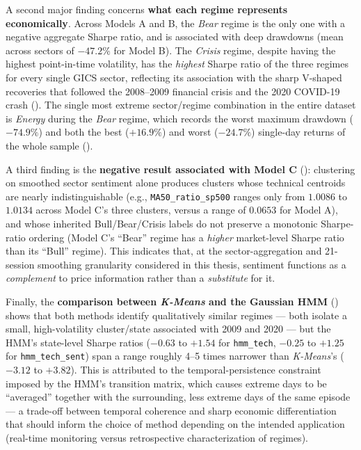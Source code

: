 A second major finding concerns \textbf{what each regime represents
economically}. Across Models A and B, the \emph{Bear} regime is the only
one with a negative aggregate Sharpe ratio, and is associated with deep
drawdowns (mean across sectors of $-47.2\%$ for Model B). The
\emph{Crisis} regime, despite having the highest point-in-time volatility,
has the \emph{highest} Sharpe ratio of the three regimes for every single
GICS sector, reflecting its association with the sharp V-shaped recoveries
that followed the 2008--2009 financial crisis and the 2020 COVID-19 crash
(). The single most extreme sector/regime
combination in the entire dataset is \emph{Energy} during the \emph{Bear}
regime, which records the worst maximum drawdown ($-74.9\%$) and both the
best ($+16.9\%$) and worst ($-24.7\%$) single-day returns of the whole
sample ().

A third finding is the \textbf{negative result associated with Model C}
(): clustering on smoothed sector sentiment alone
produces clusters whose technical centroids are nearly indistinguishable
(e.g., \texttt{MA50\_ratio\_sp500} ranges only from $1.0086$ to $1.0134$
across Model C's three clusters, versus a range of $0.0653$ for Model A),
and whose inherited Bull/Bear/Crisis labels do not preserve a monotonic
Sharpe-ratio ordering (Model C's ``Bear'' regime has a \emph{higher}
market-level Sharpe ratio than its ``Bull'' regime). This indicates that,
at the sector-aggregation and 21-session smoothing granularity considered
in this thesis, sentiment functions as a \emph{complement} to price
information rather than a \emph{substitute} for it.

Finally, the \textbf{comparison between \textit{K-Means} and the Gaussian
HMM} () shows that both methods identify
qualitatively similar regimes --- both isolate a small, high-volatility
cluster/state associated with 2009 and 2020 --- but the HMM's
state-level Sharpe ratios ($-0.63$ to $+1.54$ for \texttt{hmm\_tech},
$-0.25$ to $+1.25$ for \texttt{hmm\_tech\_sent}) span a range roughly
4--5 times narrower than \textit{K-Means}'s ($-3.12$ to $+3.82$). This is
attributed to the temporal-persistence constraint imposed by the HMM's
transition matrix, which causes extreme days to be ``averaged'' together
with the surrounding, less extreme days of the same episode --- a
trade-off between temporal coherence and sharp economic differentiation
that should inform the choice of method depending on the intended
application (real-time monitoring versus retrospective characterization of
regimes).

